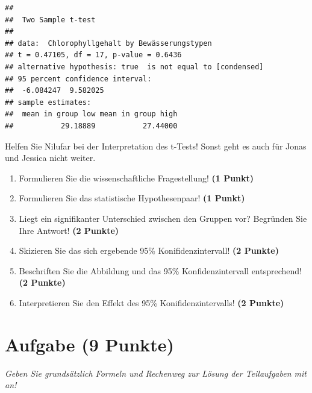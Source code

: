 \documentclass[a4paper, 9pt]{scrartcl}\usepackage[]{graphicx}\usepackage[]{xcolor}
\makeatletter
\newenvironment{kframe}{%
 \def\at@end@of@kframe{}%
 \ifinner\ifhmode%
  \def\at@end@of@kframe{\end{minipage}}%
  \begin{minipage}{\columnwidth}%
 \fi\fi%
 \def\FrameCommand##1{\hskip\@totalleftmargin \hskip-\fboxsep
 \colorbox{shadecolor}{##1}\hskip-\fboxsep
     \hskip-\linewidth \hskip-\@totalleftmargin \hskip\columnwidth}%
 \MakeFramed {\advance\hsize-\width
   \@totalleftmargin\z@ \linewidth\hsize
   \@setminipage}}%
 {\par\unskip\endMakeFramed%
 \at@end@of@kframe}
\newenvironment{knitrout}{}{} %
\makeatother
\begin{document}
\begin{knitrout}
\color{fgcolor}\begin{kframe}
\begin{verbatim}
## 
## 	Two Sample t-test
## 
## data:  Chlorophyllgehalt by Bewässerungstypen
## t = 0.47105, df = 17, p-value = 0.6436
## alternative hypothesis: true  is not equal to [condensed]
## 95 percent confidence interval:
##  -6.084247  9.582025
## sample estimates:
##  mean in group low mean in group high 
##           29.18889           27.44000
\end{verbatim}
\end{kframe}
\end{knitrout}

Helfen Sie Nilufar bei der Interpretation des t-Tests! Sonst geht es auch für Jonas und Jessica nicht weiter.

\begin{enumerate}
  \item Formulieren Sie die wissenschaftliche Fragestellung! \textbf{(1 Punkt)}
  \item Formulieren Sie das statistische Hypothesenpaar! \textbf{(1 Punkt)}
\item Liegt ein signifikanter Unterschied zwischen den Gruppen vor? Begründen Sie Ihre Antwort! \textbf{(2 Punkte)}
\item Skizieren Sie das sich ergebende 95\% Konifidenzintervall! \textbf{(2 Punkte)}
\item Beschriften Sie die Abbildung und das 95\% Konfidenzintervall entsprechend! \textbf{(2 Punkte)}  
\item Interpretieren Sie den Effekt des 95\% Konifidenzintervalls! \textbf{(2 Punkte)}
\end{enumerate} 
\clearpage

\section{Aufgabe \hfill (9 Punkte)}

\textit{Geben Sie grundsätzlich Formeln und Rechenweg zur Lösung der Teilaufgaben mit an!} \\[1Ex]
 
\end{document}
